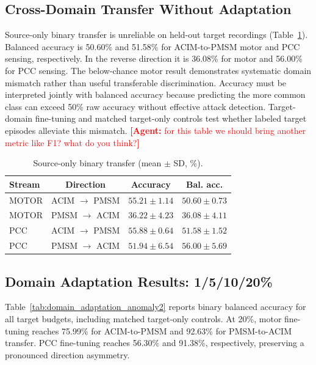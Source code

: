 \documentclass[letterpaper,journal]{IEEEtran}
\newcommand{\agent}[1]{%
    \textcolor{red}{\textbf{[Agent:} #1\textbf{]}}%
}
\begin{document}
\subsection{Cross-Domain Transfer Without Adaptation}
\label{sec:cross_domain}

Source-only binary transfer is unreliable on held-out target recordings (Table~\ref{tab:cross_domain_source_only}). Balanced accuracy is 50.60\% and 51.58\% for ACIM-to-PMSM motor and PCC sensing, respectively. In the reverse direction it is 36.08\% for motor and 56.00\% for PCC sensing. The below-chance motor result demonstrates systematic domain mismatch rather than useful transferable discrimination. Accuracy must be interpreted jointly with balanced accuracy because predicting the more common class can exceed 50\% raw accuracy without effective attack detection. Target-domain fine-tuning and matched target-only controls test whether labeled target episodes alleviate this mismatch.
\agent{ for this table we should bring another metric like F1? what do you think?}
\begin{table}[t]
\centering
\footnotesize
\caption{Source-only binary transfer (mean $\pm$ SD, \%).}
\label{tab:cross_domain_source_only}
\renewcommand{\arraystretch}{1.12}
\setlength{\tabcolsep}{3pt}
\begin{tabular}{lccc}
\hline
Stream & Direction & Accuracy & Bal. acc. \\
\hline
MOTOR & ACIM $\to$ PMSM & $55.21\pm1.14$ & $50.60\pm0.73$ \\
MOTOR & PMSM $\to$ ACIM & $36.22\pm4.23$ & $36.08\pm4.11$ \\
PCC & ACIM $\to$ PMSM & $55.88\pm0.64$ & $51.58\pm1.52$ \\
PCC & PMSM $\to$ ACIM & $51.94\pm6.54$ & $56.00\pm5.69$ \\
\hline
\end{tabular}

\end{table}

\subsection{Domain Adaptation Results: 1/5/10/20\%}
\label{sec:adaptation_results}

Table~\ref{tab:domain_adaptation_anomaly2} reports binary balanced accuracy for all target budgets, including matched target-only controls. At 20\%, motor fine-tuning reaches 75.99\% for ACIM-to-PMSM and 92.63\% for PMSM-to-ACIM transfer. PCC fine-tuning reaches 56.30\% and 91.38\%, respectively, preserving a pronounced direction asymmetry.
\end{document}
